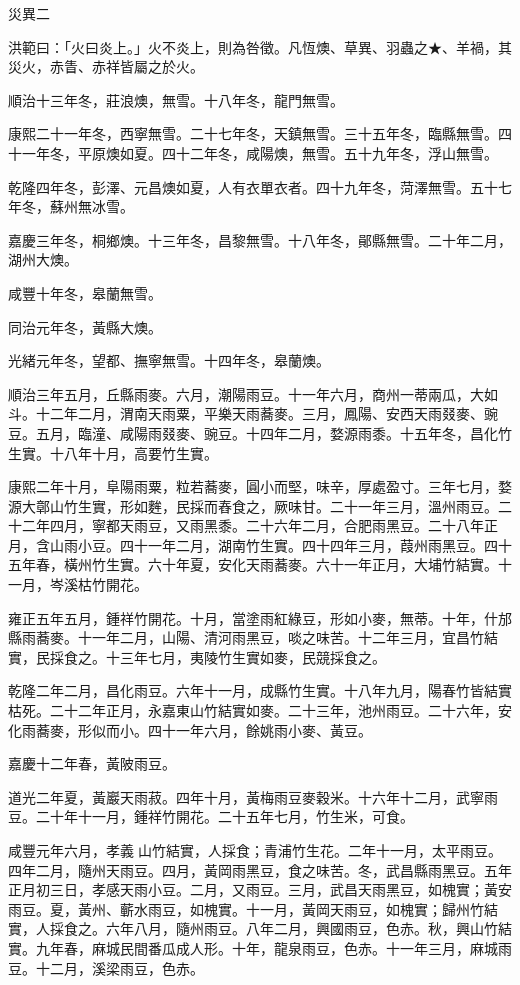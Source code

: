 
\begin{pinyinscope}
災異二

洪範曰：「火曰炎上。」火不炎上，則為咎徵。凡恆燠、草異、羽蟲之★、羊禍，其災火，赤眚、赤祥皆屬之於火。

順治十三年冬，莊浪燠，無雪。十八年冬，龍門無雪。

康熙二十一年冬，西寧無雪。二十七年冬，天鎮無雪。三十五年冬，臨縣無雪。四十一年冬，平原燠如夏。四十二年冬，咸陽燠，無雪。五十九年冬，浮山無雪。

乾隆四年冬，彭澤、元昌燠如夏，人有衣單衣者。四十九年冬，菏澤無雪。五十七年冬，蘇州無冰雪。

嘉慶三年冬，桐鄉燠。十三年冬，昌黎無雪。十八年冬，鄖縣無雪。二十年二月，湖州大燠。

咸豐十年冬，皋蘭無雪。

同治元年冬，黃縣大燠。

光緒元年冬，望都、撫寧無雪。十四年冬，皋蘭燠。

順治三年五月，丘縣雨麥。六月，潮陽雨豆。十一年六月，商州一蒂兩瓜，大如斗。十二年二月，渭南天雨粟，平樂天雨蕎麥。三月，鳳陽、安西天雨叕麥、豌豆。五月，臨潼、咸陽雨叕麥、豌豆。十四年二月，婺源雨黍。十五年冬，昌化竹生實。十八年十月，高要竹生實。

康熙二年十月，阜陽雨粟，粒若蕎麥，圓小而堅，味辛，厚處盈寸。三年七月，婺源大鄣山竹生實，形如麰，民採而舂食之，厥味甘。二十一年三月，溫州雨豆。二十二年四月，寧都天雨豆，又雨黑黍。二十六年二月，合肥雨黑豆。二十八年正月，含山雨小豆。四十一年二月，湖南竹生實。四十四年三月，葭州雨黑豆。四十五年春，橫州竹生實。六十年夏，安化天雨蕎麥。六十一年正月，大埔竹結實。十一月，岑溪枯竹開花。

雍正五年五月，鍾祥竹開花。十月，當塗雨紅綠豆，形如小麥，無蒂。十年，什邡縣雨蕎麥。十一年二月，山陽、清河雨黑豆，啖之味苦。十二年三月，宜昌竹結實，民採食之。十三年七月，夷陵竹生實如麥，民競採食之。

乾隆二年二月，昌化雨豆。六年十一月，成縣竹生實。十八年九月，陽春竹皆結實枯死。二十二年正月，永嘉東山竹結實如麥。二十三年，池州雨豆。二十六年，安化雨蕎麥，形似而小。四十一年六月，餘姚雨小麥、黃豆。

嘉慶十二年春，黃陂雨豆。

道光二年夏，黃巖天雨菽。四年十月，黃梅雨豆麥穀米。十六年十二月，武寧雨豆。二十年十一月，鍾祥竹開花。二十五年七月，竹生米，可食。

咸豐元年六月，孝義山竹結實，人採食；青浦竹生花。二年十一月，太平雨豆。四年二月，隨州天雨豆。四月，黃岡雨黑豆，食之味苦。冬，武昌縣雨黑豆。五年正月初三日，孝感天雨小豆。二月，又雨豆。三月，武昌天雨黑豆，如槐實；黃安雨豆。夏，黃州、蘄水雨豆，如槐實。十一月，黃岡天雨豆，如槐實；歸州竹結實，人採食之。六年八月，隨州雨豆。八年二月，興國雨豆，色赤。秋，興山竹結實。九年春，麻城民間番瓜成人形。十年，龍泉雨豆，色赤。十一年三月，麻城雨豆。十二月，溪梁雨豆，色赤。


\end{pinyinscope}
